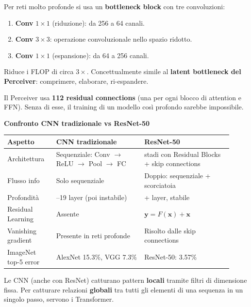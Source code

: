 \documentclass[
  11pt,
]{article}
\newcounter{none} %
\begin{document}
\begin{notabox}[title={\textbf{Bottleneck block (ResNet-50+)}}]
Per reti molto profonde si usa un \textbf{bottleneck block} con tre convoluzioni:
\begin{enumerate}
\item \textbf{Conv} $1 \times 1$ (riduzione): da 256 a 64 canali.
\item \textbf{Conv} $3 \times 3$: operazione convoluzionale nello spazio ridotto.
\item \textbf{Conv} $1 \times 1$ (espansione): da 64 a 256 canali.
\end{enumerate}
Riduce i FLOP di circa $3\times$. Concettualmente simile al \textbf{latent bottleneck del Perceiver}: comprimere, elaborare, ri-espandere.
\end{notabox}

\begin{notabox}[title={\textbf{Collegamento al Perceiver}}]
Il Perceiver usa \textbf{112 residual connections} (una per ogni blocco di attention e FFN). Senza di esse, il training di un modello così profondo sarebbe impossibile.
\end{notabox}

\textbf{Confronto CNN tradizionale vs ResNet-50}

{\def\LTcaptype{none}
\begin{longtable}{@{}
  >{\raggedright\arraybackslash}p{0.20\linewidth}
  >{\raggedright\arraybackslash}p{0.36\linewidth}
  >{\raggedright\arraybackslash}p{0.36\linewidth}@{}}
\toprule
\textbf{Aspetto} & \textbf{CNN tradizionale} & \textbf{ResNet-50} \\
\midrule\endhead
\bottomrule\endlastfoot
Architettura & Sequenziale: Conv $\to$ ReLU $\to$ Pool $\to$ FC & 5 stadi con Residual Blocks + skip connections \\
Flusso info & Solo sequenziale & Doppio: sequenziale + scorciatoia \\
Profondit\`a & 5--19 layer (poi instabile) & 50+ layer, stabile \\
Residual Learning & Assente & $\mathbf{y} = F(\mathbf{x}) + \mathbf{x}$ \\
Vanishing gradient & Presente in reti profonde & Risolto dalle skip connections \\
ImageNet top-5 error & AlexNet 15.3\%, VGG 7.3\% & ResNet-50: 3.57\% \\
\end{longtable}
}

Le CNN (anche con ResNet) catturano pattern \textbf{locali} tramite filtri di dimensione fissa. Per catturare relazioni \textbf{globali} tra tutti gli elementi di una sequenza in un singolo passo, servono i Transformer.
\end{document}
